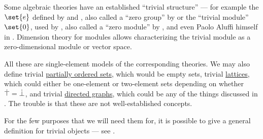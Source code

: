 \begin{concept}\label{rem:trivial_object}
  Some algebraic theories have an established \enquote{trivial structure} --- for example the  \( \set{ e } \) defined by  and , also called a \enquote{zero group} by  or the \enquote{trivial module} \( \set{ 0 } \), used by , also called a \enquote{zero module} by ,  and even Paolo Aluffi himself in \cite[341]{Aluffi2009Algebra}. Dimension theory for modules allows characterizing the trivial module as a zero-dimensional module or vector space.

  All these are single-element models of the corresponding theories. We may also define trivial \hyperref[def:partially_ordered_set]{partially ordered sets}, which would be empty sets, trivial \hyperref[def:lattice]{lattices}, which could either be one-element or two-element sets depending on whether \( \dot{\top} = \dot{\bot} \), and trivial \hyperref[def:directed_graph]{directed graphs}, which could be any of the things discussed in . The trouble is that these are not well-established concepts.

  For the few purposes that we will need them for, it is possible to give a general definition for trivial objects --- see .
\end{concept}

